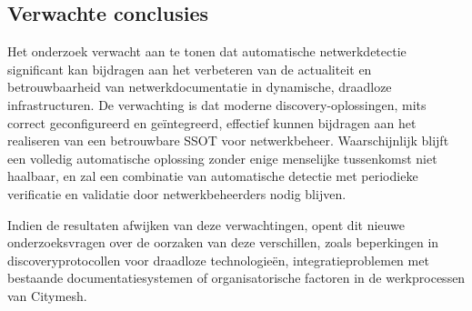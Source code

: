 \subsection{Verwachte conclusies}

Het onderzoek verwacht aan te tonen dat automatische netwerkdetectie significant kan bijdragen aan het verbeteren van de actualiteit en betrouwbaarheid van netwerkdocumentatie in dynamische, draadloze infrastructuren. De verwachting is dat moderne discovery-oplossingen, mits correct geconfigureerd en geïntegreerd, effectief kunnen bijdragen aan het realiseren van een betrouwbare SSOT voor netwerkbeheer.\autocite{Campbell2007} Waarschijnlijk blijft een volledig automatische oplossing zonder enige menselijke tussenkomst niet haalbaar, en zal een combinatie van automatische detectie met periodieke verificatie en validatie door netwerkbeheerders nodig blijven.

Indien de resultaten afwijken van deze verwachtingen, opent dit nieuwe onderzoeksvragen over de oorzaken van deze verschillen, zoals beperkingen in discoveryprotocollen voor draadloze technologieën, integratieproblemen met bestaande documentatiesystemen of organisatorische factoren in de werkprocessen van Citymesh.
